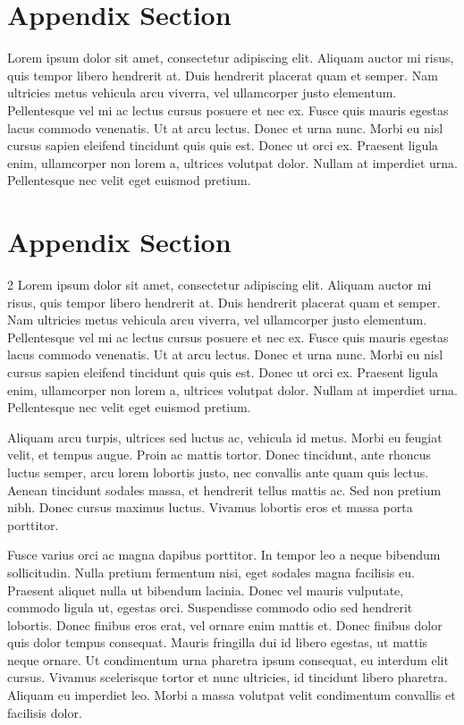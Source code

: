 \documentclass[
	a4paper, %
]{CSMakotoTechnicalReport}
\begin{document}
\begin{appendices}

\section{Appendix Section}

Lorem ipsum dolor sit amet, consectetur adipiscing elit. Aliquam auctor mi risus, quis tempor libero hendrerit at. Duis hendrerit placerat quam et semper. Nam ultricies metus vehicula arcu viverra, vel ullamcorper justo elementum. Pellentesque vel mi ac lectus cursus posuere et nec ex. Fusce quis mauris egestas lacus commodo venenatis. Ut at arcu lectus. Donec et urna nunc. Morbi eu nisl cursus sapien eleifend tincidunt quis quis est. Donec ut orci ex. Praesent ligula enim, ullamcorper non lorem a, ultrices volutpat dolor. Nullam at imperdiet urna. Pellentesque nec velit eget euismod pretium.

\section{Appendix Section}

\begin{multicols}{2} %
Lorem ipsum dolor sit amet, consectetur adipiscing elit. Aliquam auctor mi risus, quis tempor libero hendrerit at. Duis hendrerit placerat quam et semper. Nam ultricies metus vehicula arcu viverra, vel ullamcorper justo elementum. Pellentesque vel mi ac lectus cursus posuere et nec ex. Fusce quis mauris egestas lacus commodo venenatis. Ut at arcu lectus. Donec et urna nunc. Morbi eu nisl cursus sapien eleifend tincidunt quis quis est. Donec ut orci ex. Praesent ligula enim, ullamcorper non lorem a, ultrices volutpat dolor. Nullam at imperdiet urna. Pellentesque nec velit eget euismod pretium.

Aliquam arcu turpis, ultrices sed luctus ac, vehicula id metus. Morbi eu feugiat velit, et tempus augue. Proin ac mattis tortor. Donec tincidunt, ante rhoncus luctus semper, arcu lorem lobortis justo, nec convallis ante quam quis lectus. Aenean tincidunt sodales massa, et hendrerit tellus mattis ac. Sed non pretium nibh. Donec cursus maximus luctus. Vivamus lobortis eros et massa porta porttitor.

Fusce varius orci ac magna dapibus porttitor. In tempor leo a neque bibendum sollicitudin. Nulla pretium fermentum nisi, eget sodales magna facilisis eu. Praesent aliquet nulla ut bibendum lacinia. Donec vel mauris vulputate, commodo ligula ut, egestas orci. Suspendisse commodo odio sed hendrerit lobortis. Donec finibus eros erat, vel ornare enim mattis et. Donec finibus dolor quis dolor tempus consequat. Mauris fringilla dui id libero egestas, ut mattis neque ornare. Ut condimentum urna pharetra ipsum consequat, eu interdum elit cursus. Vivamus scelerisque tortor et nunc ultricies, id tincidunt libero pharetra. Aliquam eu imperdiet leo. Morbi a massa volutpat velit condimentum convallis et facilisis dolor.
\end{multicols} %


\end{appendices}
\end{document}
